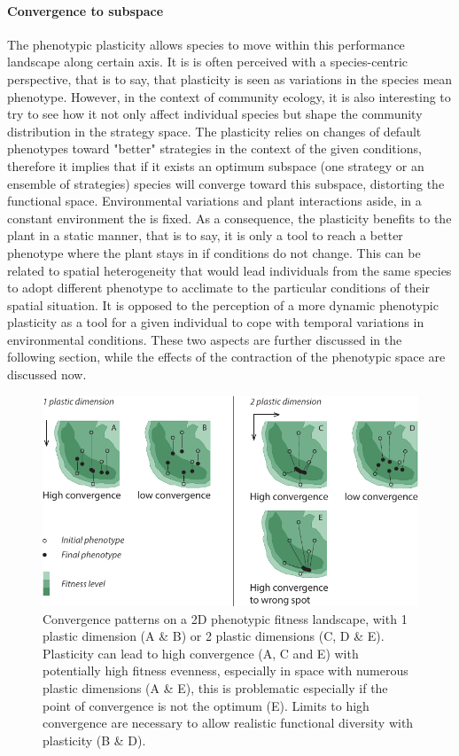 \paragraph{Convergence to subspace}

The phenotypic plasticity allows species to move within this performance landscape along certain axis. It is is often perceived with a species-centric perspective, that is to say, that plasticity is seen as variations in the species mean phenotype. However, in the context of community ecology, it is also interesting to try to see how it not only affect individual species but shape the community distribution in the strategy space. The plasticity relies on changes of default phenotypes toward "better" strategies in the context of the given conditions, therefore it implies that if it exists an optimum subspace (one strategy or an ensemble of strategies) species will converge toward this subspace, distorting the functional space. Environmental variations and plant interactions aside, in a constant environment the  is fixed. As a consequence, the plasticity benefits to the plant in a static manner, that is to say, it is only a tool to reach a better phenotype where the plant stays in if conditions do not change. This can be related to spatial heterogeneity that would lead individuals from the same species to adopt different phenotype to acclimate to the particular conditions of their spatial situation. It is opposed to the perception of a more dynamic phenotypic plasticity as a tool for a given individual to cope with temporal variations in environmental conditions. These two aspects are further discussed in the following section, while the effects of the contraction of the phenotypic space are discussed now.

\begin{figure}\label{fig:convergence}
\includegraphics[width = \textwidth]{./2_PP/Figures/Landscape/ld_convergence.pdf}
\caption[Convergence patterns]{Convergence patterns on a 2D phenotypic fitness landscape, with 1 plastic dimension (A \& B) or 2 plastic dimensions (C, D \& E). Plasticity can lead to high convergence (A, C and E) with potentially high fitness evenness, especially in space with numerous plastic dimensions (A \& E), this is problematic especially if the point of convergence is not the optimum (E). Limits to high convergence are necessary to allow realistic functional diversity with plasticity (B \& D).}
\end{figure}

